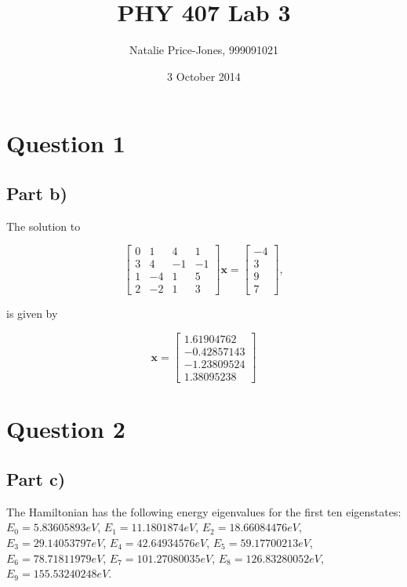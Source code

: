 \documentclass[a4paper,12pt]{article}
\begin{document}
\onehalfspacing
\title{PHY 407 Lab 3}
\author{Natalie Price-Jones, 999091021}
\date{3 October 2014}
\maketitle

\section{Question 1}

\subsection{Part b)}

The solution to

\[
\left[ \begin{array}{cccc}
0 & 1 & 4 & 1\\
3 & 4 & -1 & -1\\
1 & -4 & 1 & 5\\
2 & -2 & 1 & 3
\end{array} \right]
\mathbf{x} = 
\left[ \begin{array}{c}
-4 \\ 3 \\ 9 \\ 7
\end{array}\right],
\]

is given by 

\[
\mathbf{x} = \left[ \begin{array}{c}
 1.61904762 \\ -0.42857143 \\ -1.23809524 \\ 1.38095238
\end{array}\right]
\]

\section{Question 2}

\subsection{Part c)}

The Hamiltonian has the following energy eigenvalues for the first ten eigenstates: $E_0 = 5.83605893 eV$, $E_1 = 11.1801874 eV$, $E_2 = 18.66084476 eV$, $E_3 = 29.14053797 eV$, $E_4 = 42.64934576 eV$, $E_5 = 59.17700213 eV$, $E_6 = 78.71811979 eV$, $E_7 = 101.27080035 eV$, $E_8 =   126.83280052 eV$, $E_9 = 155.53240248 eV$.
\end{document}
